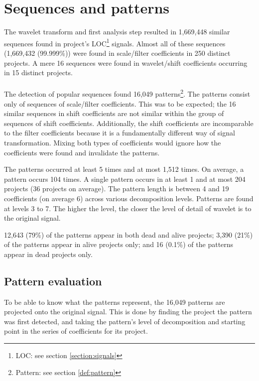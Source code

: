 \section{Sequences and patterns}
The wavelet transform and first analysis step resulted in 1,669,448 similar
sequences found in project's LOC\footnote{LOC: see section
\ref{section:signals}} signals. Almost all of these sequences (1,669,432
(99.999\%)) were found in scale/filter coefficients in 250 distinct projects.
A mere 16 sequences were found in wavelet/shift coefficients occurring in 15
distinct projects.

\paragraph{}
The detection of popular sequences found 16,049 patterns\footnote{Pattern:
see section \ref{def:pattern}}. The patterns consist only of sequences
of scale/filter coefficients. This was to be expected; the 16 similar sequences
in shift coefficients are not similar within the group of sequences of shift
coefficients. Additionally, the shift coefficients are incomparable to the
filter coefficients because it is a fundamentally different way of signal
transformation. Mixing both types of coefficients would ignore how the
coefficients were found and invalidate the patterns.

The patterns occurred at least 5 times and at most 1,512 times. On average, a
pattern occurs 104 times. A single pattern occurs in at least 1 and at most 204
projects (36 projects on average). The pattern length is between 4 and 19
coefficients (on average 6) across various decomposition levels. Patterns are
found at levels 3 to 7. The higher the level, the closer the level of detail of
wavelet is to the original signal.

12,643 (79\%) of the patterns appear in both dead and alive projects; 3,390
(21\%) of the patterns appear in alive projects only; and 16 (0.1\%) of the
patterns appear in dead projects only.

\subsection{Pattern evaluation}
\label{section:pattern_evaluation}
To be able to know what the patterns represent, the 16,049 patterns are
projected onto the original signal. This is done by finding the project the
pattern was first detected, and taking the pattern's level of decomposition and
starting point in the series of coefficients for its project.

